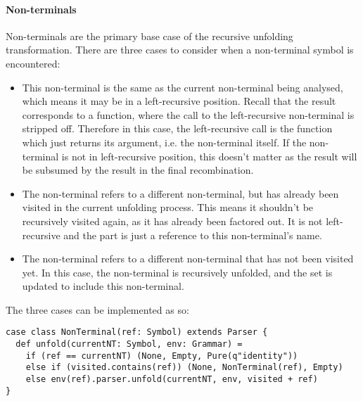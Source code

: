 \documentclass[../../main.tex]{subfiles}
\begin{document}

\paragraph{Non-terminals}
Non-terminals are the primary base case of the recursive unfolding transformation.
There are three cases to consider when a non-terminal symbol is encountered:
\begin{itemize}
  \item This non-terminal is the same as the current non-terminal being analysed, which means it may be in a left-recursive position. Recall that the  result corresponds to a function, where the call to the left-recursive non-terminal is stripped off. Therefore in this case, the left-recursive call is the  function which just returns its argument, i.e. the non-terminal itself. If the non-terminal is not in left-recursive position, this doesn't matter as the  result will be subsumed by the  result in the final recombination.
  \item The non-terminal refers to a different non-terminal, but has already been visited in the current unfolding process. This means it shouldn't be recursively visited again, as it has already been factored out. It is not left-recursive and the  part is just a reference to this non-terminal's name.
  \item The non-terminal refers to a different non-terminal that has not been visited yet. In this case, the non-terminal is recursively unfolded, and the  set is updated to include this non-terminal.
\end{itemize}
%
The three cases can be implemented as so:
\begin{verbatim}
case class NonTerminal(ref: Symbol) extends Parser {
  def unfold(currentNT: Symbol, env: Grammar) =
    if (ref == currentNT) (None, Empty, Pure(q"identity"))
    else if (visited.contains(ref)) (None, NonTerminal(ref), Empty)
    else env(ref).parser.unfold(currentNT, env, visited + ref)
}
\end{verbatim}
\end{document}
